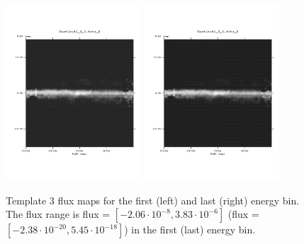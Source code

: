\documentclass{article}
\begin{document}
\begin{figure}
\centering
\includegraphics[trim = 50 100 70 100, clip = true, width=0.45\textwidth]{figs/Template_maps/Template3_Ebin01}
\includegraphics[trim = 50 100 70 100, clip = true, width=0.45\textwidth]{figs/Template_maps/Template3_Ebin71}
\caption{Template 3 flux maps for the first (left) and last (right) energy bin. The flux range is flux = $[-2.06 \cdot 10^{-8}, 3.83 \cdot 10^{-6}]$ (flux = $[-2.38 \cdot 10^{-20}, 5.45 \cdot 10^{-18}]$) in the first (last) energy bin.}
\end{figure}
\end{document}
